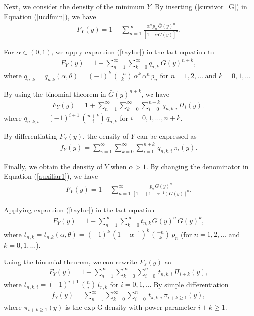 \documentclass[12pt]{article}
\begin{document}
Next, we consider the density of the minimum $Y$. By inserting (\ref{survivor_G}) in Equation (\ref{ucdfmin}), we have
\begin{eqnarray}\label{auxiliar1}
F_Y(y)=1-\sum_{n=1}^{\infty}\frac{\alpha^n\,p_n\,\bar{G}(y)^n}{\left[1-\bar{\alpha}\bar{G}(y)\right]^n}.
\end{eqnarray}

For $\alpha\in(0,1)$, we apply expansion (\ref{taylor}) in the last equation to
\begin{eqnarray*}
F_Y(y)=1-\sum_{n=1}^{\infty}\sum^{\infty}_{k=0}q_{n,k}\,\bar{G}(y)^{n+k},
\end{eqnarray*}
where $q_{n,k}=q_{n,k}(\alpha,\theta)=(-1)^k\,{-n \choose k}\,\bar{\alpha}^k\,\alpha^n\,p_n$
for $n=1,2,\ldots$ and $k=0,1,\ldots$

By using the binomial theorem in $\bar{G}(y)^{n+k}$, we have
\begin{eqnarray*}
F_Y(y)=1+\sum_{n=1}^{\infty}\sum^{\infty}_{k=0}\sum^{n+k}_{i=0}\,q_{n,k,i} \,\Pi_i(y),
\end{eqnarray*}
where $q_{n,k,i}=(-1)^{i+1}\,{n+k \choose i}\,q_{n,k}$ for $i=0,1,\ldots,n+k$.

By differentiating $F_Y(y)$, the density of $Y$ can be expressed as
\begin{eqnarray}\label{densityY}
f_Y(y)=\sum_{n=1}^{\infty}\sum^{\infty}_{k=0}\sum^{n+k}_{i=1}\,q_{n,k,i}\,\pi_i(y).
\end{eqnarray}


Finally, we obtain the density of $Y$ when $\alpha> 1$. By changing the
denominator in Equation (\ref{auxiliar1}), we have
\begin{eqnarray*}
F_Y(y)=1-\sum_{n=1}^{\infty}\frac{p_n\,\bar{G}(y)^n}{\left[1-(1-\alpha^{-1})G(y)\right]^n}.
\end{eqnarray*}

Applying expansion (\ref{taylor}) in the last equation
\begin{eqnarray*}
F_Y(y)=1-\sum_{n=1}^{\infty}\sum^{\infty}_{k=0}t_{n,k}\,\bar{G}(y)^n\,G(y)^k ,
\end{eqnarray*}
where $t_{n,k}=t_{n,k}(\alpha,\theta)=(-1)^k\,(1-\alpha^{-1})^k\,{-n \choose k}\,p_n$ (for $n=1,2,\ldots$ and $k=0,1,\ldots$).

Using the binomial theorem, we can rewrite $F_Y(y)$ as
\begin{eqnarray*}
F_Y(y)=1+\sum_{n=1}^{\infty}\sum^{\infty}_{k=0}\sum^{n}_{i=0}\,t_{n,k,i}\,\Pi_{i+k}(y),
\end{eqnarray*}
where $t_{n,k,i}=(-1)^{i+1}\,{n \choose i}\,t_{n,k}$ for $i=0,1,\ldots$ By simple differentiation
\begin{eqnarray}\label{densityY1}
f_Y(y)=\sum_{n=1}^{\infty}\sum^{\infty}_{k=0}\sum^{n}_{i=0}\,t_{n,k,i}\,\pi_{i+k\ge 1}(y),
\end{eqnarray}
where $\pi_{i+k\ge 1}(y)$ is the exp-G density with power parameter $i+k \ge 1$.
\end{document}
